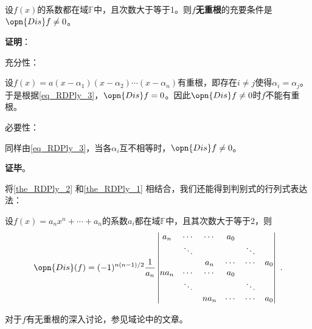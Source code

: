 \begin{theorem}{}\label{the_RDPly_1}
设$f(x)$的系数都在域$\mathbb{F}$中，且次数大于等于1。则$f$\textbf{无重根}的充要条件是$\opn{Dis}f\neq 0$。
\end{theorem}

\textbf{证明}：

充分性：

设$f(x)=a(x-\alpha_1)(x-\alpha_2)\cdots(x-\alpha_n)$有重根，即存在$i\neq j$使得$\alpha_i=\alpha_j$。于是根据\autoref{eq_RDPly_3}，$\opn{Dis}f = 0$。因此$\opn{Dis}f\neq 0$时$f$不能有重根。

必要性：

同样由\autoref{eq_RDPly_3}，当各$\alpha_i$互不相等时，$\opn{Dis}f\neq 0$。

\textbf{证毕}。


将\autoref{the_RDPly_2} 和\autoref{the_RDPly_1} 相结合，我们还能得到判别式的行列式表达法：

\begin{theorem}{}
设$f(x)=a_nx^n+\cdots+a_n$的系数$a_i$都在域$\mathbb{F}$中，且其次数大于等于2，则
\begin{equation}
\opn{Dis}(f) = (-1)^{n(n-1)/2}\frac{1}{a_n}
\begin{vmatrix}
a_n&\cdots&\cdots&a_0\\
&\ddots&&&\ddots\\
&&a_n&\cdots&\cdots&a_0\\
na_n&\cdots&\cdots&a_0\\
&\ddots&&&\ddots\\
&&na_n&\cdots&\cdots&a_0
\end{vmatrix}~.
\end{equation}
\end{theorem}

对于$f$有无重根的深入讨论，参见域论中的文章。









